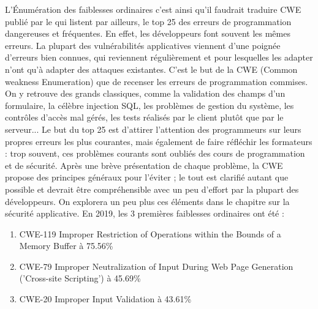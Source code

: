  L'Énumération des faiblesses ordinaires c'est ainsi qu'il faudrait traduire CWE publié par le  qui listent  par ailleurs, le top 25 des  erreurs de programmation dangereuses et fréquentes. 
En effet, les  développeurs font souvent les mêmes erreurs.
La plupart des vulnérabilités applicatives viennent d'une poignée d'erreurs bien connues, qui reviennent régulièrement et pour lesquelles les adapter n'ont qu'à adapter des attaques existantes.
C'est le but de la CWE (Common weakness Enumeration) que de recenser les erreurs de programmation commises. 
On y retrouve des grands classiques, comme la validation des champs d'un formulaire, la célèbre injection SQL, les problèmes de gestion du système, les contrôles d'accès mal gérés, les tests réalisés par le client plutôt que par le serveur...
Le but du top 25 est d'attirer l'attention des programmeurs sur leurs propres erreurs les plus courantes, mais également de faire réfléchir les formateurs : trop souvent, ces problèmes courants sont oubliés des cours de programmation et de sécurité. Après une brève présentation de chaque problème, la CWE propose des principes généraux pour l'éviter ; le tout est clarifié autant que possible et devrait être compréhensible avec un peu d'effort par la plupart des développeurs. On explorera un peu plus ces éléments dans le chapitre sur la sécurité applicative.
En 2019, les 3 premières faiblesses ordinaires ont été : 

\begin{enumerate}
  \item CWE-119	Improper Restriction of Operations within the Bounds of a Memory Buffer	à 75.56\%
  \item CWE-79	Improper Neutralization of Input During Web Page Generation ('Cross-site Scripting')	à 45.69\%
  \item CWE-20	Improper Input Validation à 43.61\%
\end{enumerate}




